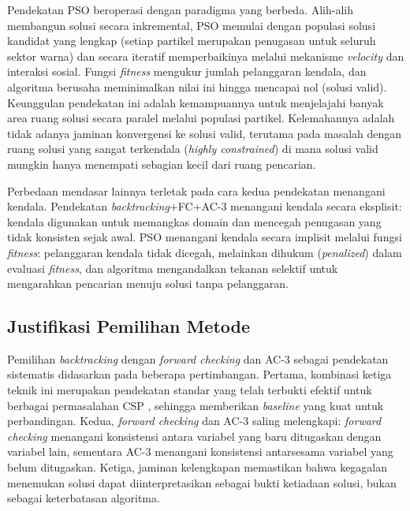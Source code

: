 Pendekatan PSO beroperasi dengan paradigma yang berbeda. Alih-alih membangun solusi secara inkremental, PSO memulai dengan populasi solusi kandidat yang lengkap (setiap partikel merupakan penugasan untuk seluruh sektor warna) dan secara iteratif memperbaikinya melalui mekanisme \textit{velocity} dan interaksi sosial. Fungsi \textit{fitness} mengukur jumlah pelanggaran kendala, dan algoritma berusaha meminimalkan nilai ini hingga mencapai nol (solusi valid). Keunggulan pendekatan ini adalah kemampuannya untuk menjelajahi banyak area ruang solusi secara paralel melalui populasi partikel. Kelemahannya adalah tidak adanya jaminan konvergensi ke solusi valid, terutama pada masalah dengan ruang solusi yang sangat terkendala (\textit{highly constrained}) di mana solusi valid mungkin hanya menempati sebagian kecil dari ruang pencarian.

Perbedaan mendasar lainnya terletak pada cara kedua pendekatan menangani kendala. Pendekatan \textit{backtracking}+FC+AC-3 menangani kendala secara eksplisit: kendala digunakan untuk memangkas domain dan mencegah penugasan yang tidak konsisten sejak awal. PSO menangani kendala secara implisit melalui fungsi \textit{fitness}: pelanggaran kendala tidak dicegah, melainkan dihukum (\textit{penalized}) dalam evaluasi \textit{fitness}, dan algoritma mengandalkan tekanan selektif untuk mengarahkan pencarian menuju solusi tanpa pelanggaran.

\subsection{Justifikasi Pemilihan Metode}
\label{subsec:justifikasi-metode}

Pemilihan \textit{backtracking} dengan \textit{forward checking} dan AC-3 sebagai pendekatan sistematis didasarkan pada beberapa pertimbangan. Pertama, kombinasi ketiga teknik ini merupakan pendekatan standar yang telah terbukti efektif untuk berbagai permasalahan CSP \cite{bessiere2006constraint}, sehingga memberikan \textit{baseline} yang kuat untuk perbandingan. Kedua, \textit{forward checking} dan AC-3 saling melengkapi: \textit{forward checking} menangani konsistensi antara variabel yang baru ditugaskan dengan variabel lain, sementara AC-3 menangani konsistensi antarsesama variabel yang belum ditugaskan. Ketiga, jaminan kelengkapan memastikan bahwa kegagalan menemukan solusi dapat diinterpretasikan sebagai bukti ketiadaan solusi, bukan sebagai keterbatasan algoritma.

